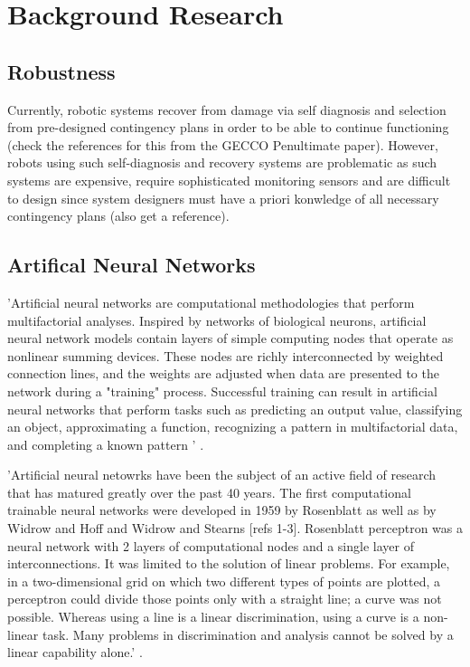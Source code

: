 
\chapter{Background Research} %

\label{Chapter2} %


\section{Robustness}

Currently, robotic systems recover from damage via self diagnosis and selection from pre-designed contingency plans in order to be able to continue functioning (check the references for this from the GECCO Penultimate paper). However, robots using such self-diagnosis and recovery systems are problematic as such systems are expensive, require sophisticated monitoring sensors and are difficult to design since system designers must have a priori konwledge of all necessary contingency plans (also get a reference).


\section{Artifical Neural Networks}

'Artificial neural networks are computational methodologies that perform multifactorial analyses. Inspired by networks of biological neurons, artificial neural network models contain layers of simple computing nodes that operate as nonlinear summing devices. These nodes are richly interconnected by weighted connection lines, and the weights are adjusted when data are presented to the network during a "training" process. Successful training can result in artificial neural networks that perform tasks such as predicting an output value, classifying an object, approximating a function, recognizing a pattern in multifactorial data, and completing a known pattern ' \cite{dayhoff2001artificial}.

'Artificial neural netowrks have been the subject of an active field of research that has matured greatly over the past 40 years. The first computational trainable neural networks were developed in 1959 by Rosenblatt as well as by Widrow and Hoff and Widrow and Stearns [refs 1-3]. Rosenblatt perceptron was a neural network with 2 layers of computational nodes and a single layer of interconnections. It was limited to the solution of linear problems. For example, in a two-dimensional grid on which two different types of points are plotted, a perceptron could divide those points only with a straight line; a curve was not possible. Whereas using a line is a linear discrimination, using a curve is a non-linear task. Many problems in discrimination and analysis cannot be solved by a linear capability alone.' \cite{dayhoff2001artificial}.


